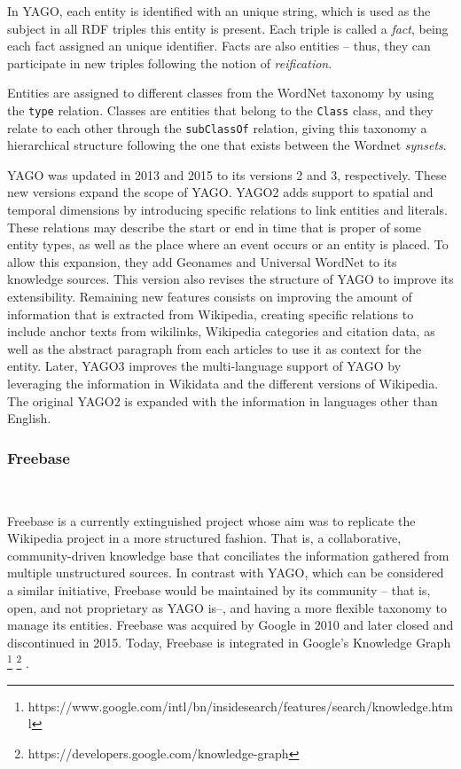 In YAGO, each entity is identified with an unique string, which is used as the subject in all RDF triples this entity is present. Each triple is called a \emph{fact}, being each fact assigned an unique identifier. Facts are also entities -- thus, they can participate in new triples following the notion of \emph{reification}.

Entities are assigned to different classes from the WordNet taxonomy by using the \texttt{type} relation. Classes are entities that belong to the \texttt{Class} class, and they relate to each other through the \texttt{subClassOf} relation, giving this taxonomy a hierarchical structure following the one that exists between the Wordnet \emph{synsets}.

YAGO was updated in 2013 and 2015 to its versions 2 and 3, respectively. These new versions expand the scope of YAGO. YAGO2 \cite{yago2013} adds support to spatial and temporal dimensions by introducing specific relations to link entities and literals. These relations may describe the start or end in time that is proper of some entity types, as well as the place where an event occurs or an entity is placed. To allow this expansion, they add Geonames and Universal WordNet to its knowledge sources. This version also revises the structure of YAGO to improve its extensibility. Remaining new features consists on improving the amount of information that is extracted from Wikipedia, creating specific relations to include anchor texts from wikilinks, Wikipedia categories and citation data, as well as the abstract paragraph from each articles to use it as context for the entity. Later, YAGO3 \cite{yago2013} improves the multi-language support of YAGO by leveraging the information in Wikidata and the different versions of Wikipedia. The original YAGO2 is expanded with the information in languages other than English.

\subsubsection{Freebase}~

Freebase \cite{bollacker2007,bollacker2008} is a currently extinguished project whose aim was to replicate the Wikipedia project in a more structured fashion. That is, a collaborative, community-driven knowledge base that conciliates the information gathered from multiple unstructured sources. In contrast with YAGO, which can be considered a similar initiative, Freebase would be maintained by its community -- that is, open, and not proprietary as YAGO is--, and having a more flexible taxonomy to manage its entities. Freebase was acquired by Google in 2010 and later closed and discontinued in 2015. Today, Freebase is integrated in Google's Knowledge Graph%
\footnote{https://www.google.com/intl/bn/insidesearch/features/search/knowledge.html}%
\footnote{https://developers.google.com/knowledge-graph}%
.

